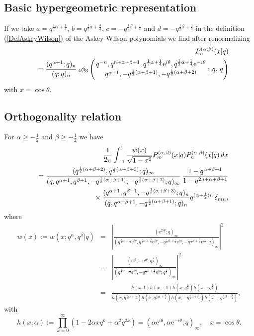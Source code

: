 \documentclass[envcountchap,graybox]{svmono}
\newcommand{\qhyp}[5]{\mbox{}_{#1}{\phi}_{#2}
\left(\genfrac{}{}{0pt}{}{#3}{#4}\,;\,q,\,#5\right)}
\newcommand{\mathindent}{\hspace{7.5mm}}
\newcommand{\e}{\textrm{e}}
\begin{document}
\subsection*{Basic hypergeometric representation} If we take $a=q^{\frac{1}{2}\alpha+\frac{1}{4}}$, $b=q^{\frac{1}{2}\alpha+\frac{3}{4}}$,
$c=-q^{\frac{1}{2}\beta+\frac{1}{4}}$ and $d=-q^{\frac{1}{2}\beta+\frac{3}{4}}$ in
the definition (\ref{DefAskeyWilson}) of the Askey-Wilson polynomials we find
after renormalizing
\begin{eqnarray}
\label{DefContqJacobi}
& &P_n^{(\alpha,\beta)}(x|q)\nonumber\\
& &{}=\frac{(q^{\alpha+1};q)_n}{(q;q)_n}\,
\qhyp{4}{3}{q^{-n},q^{n+\alpha+\beta+1},q^{\frac{1}{2}\alpha+\frac{1}{4}}\e^{i\theta},q^{\frac{1}{2}\alpha+\frac{1}{4}}\e^{-i\theta}}
{q^{\alpha+1},-q^{\frac{1}{2}(\alpha+\beta+1)},-q^{\frac{1}{2}(\alpha+\beta+2)}}{q}
\end{eqnarray}
with $x=\cos\theta$.

\newpage

\subsection*{Orthogonality relation}
For $\alpha\geq -\frac{1}{2}$ and $\beta\geq -\frac{1}{2}$ we have
\begin{eqnarray}
\label{OrtContqJacobi}
& &\frac{1}{2\pi}\int_{-1}^1\frac{w(x)}{\sqrt{1-x^2}}
P_m^{(\alpha,\beta)}(x|q)P_n^{(\alpha,\beta)}(x|q)\,dx\nonumber\\
& &{}=\frac{(q^{\frac{1}{2}(\alpha+\beta+2)},q^{\frac{1}{2}(\alpha+\beta+3)};q)_{\infty}}{(q,q^{\alpha+1},q^{\beta+1},-q^{\frac{1}{2}(\alpha+\beta+1)},
-q^{\frac{1}{2}(\alpha+\beta+2)};q)_{\infty}}\,\frac{1-q^{\alpha+\beta+1}}{1-q^{2n+\alpha+\beta+1}}\nonumber\\
& &{}\mathindent{}\times\frac{(q^{\alpha+1},q^{\beta+1},-q^{\frac{1}{2}(\alpha+\beta+3)};q)_n}
{(q,q^{\alpha+\beta+1},-q^{\frac{1}{2}(\alpha+\beta+1)};q)_n}q^{(\alpha+\frac{1}{2})n}\,\delta_{mn},
\end{eqnarray}
where
\begin{eqnarray*} w(x):=w(x;q^{\alpha},q^{\beta}|q)&=&\left|\frac{(\e^{2i\theta};q)_{\infty}}
{(q^{\frac{1}{2}\alpha+\frac{1}{4}}\e^{i\theta},q^{\frac{1}{2}\alpha+\frac{3}{4}}\e^{i\theta},
-q^{\frac{1}{2}\beta+\frac{1}{4}}\e^{i\theta},-q^{\frac{1}{2}\beta+\frac{3}{4}}\e^{i\theta};q)_{\infty}}\right|^2\\
&=&\left|\frac{(\e^{i\theta},-\e^{i\theta};q^{\frac{1}{2}})_{\infty}}{(q^{\frac{1}{2}\alpha+\frac{1}{4}}\e^{i\theta},
-q^{\frac{1}{2}\beta+\frac{1}{4}}\e^{i\theta};q^{\frac{1}{2}})_{\infty}}\right|^2\\
&=&\frac{h(x,1)h(x,-1)h(x,q^{\frac{1}{2}})h(x,-q^{\frac{1}{2}})}
{h(x,q^{\frac{1}{2}\alpha+\frac{1}{4}})h(x,q^{\frac{1}{2}\alpha+\frac{3}{4}})
h(x,-q^{\frac{1}{2}\beta+\frac{1}{4}})h(x,-q^{\frac{1}{2}\beta+\frac{3}{4}})},
\end{eqnarray*}
with
$$h(x,\alpha):=\prod_{k=0}^{\infty}\left(1-2\alpha xq^k+\alpha^2q^{2k}\right)
=\left(\alpha \e^{i\theta},\alpha \e^{-i\theta};q\right)_{\infty},\quad x=\cos\theta.$$
\end{document}
